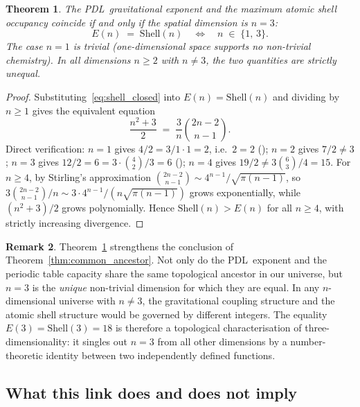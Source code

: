 \documentclass[11pt,a4paper]{article}
\newtheorem{theorem}{Theorem}[section]
\theoremstyle{definition}
\newtheorem{remark}[theorem]{Remark}
\newcommand{\PDL}{\textnormal{PDL}}
\newcommand{\Efun}{E}
\newcommand{\Shell}{\mathrm{Shell}}
\begin{document}
\begin{theorem}
  \label{thm:n_equals_3}
  The \PDL\ gravitational exponent and the maximum atomic shell occupancy coincide if and only if the spatial dimension is $n = 3$:
  \begin{equation}
    \label{eq:n3_unique}
    \Efun(n) \;=\; \Shell(n) \quad\iff\quad n \;\in\; \{1,\, 3\}.
  \end{equation}
  The case $n=1$ is trivial (one-dimensional space supports no non-trivial chemistry). In all dimensions $n \geq 2$ with $n \neq 3$, the two quantities are strictly unequal.
\end{theorem}

\begin{proof}
  Substituting~\eqref{eq:shell_closed} into $\Efun(n) = \Shell(n)$ and dividing by $n \geq 1$ gives the equivalent equation
  \[
    \frac{n^2+3}{2} \;=\; \frac{3}{n}\binom{2n-2}{n-1}.
  \]
  Direct verification: $n=1$ gives $4/2 = 3/1 \cdot 1 = 2$, i.e.\ $2=2$ (\checkmark); $n=2$ gives $7/2 \neq 3$; $n=3$ gives $12/2 = 6 = 3 \cdot \binom{4}{2}/3 = 6$ (\checkmark); $n=4$ gives $19/2 \neq 3\binom{6}{3}/4 = 15$. For $n \geq 4$, by Stirling's approximation $\binom{2n-2}{n-1} \sim 4^{n-1}/\sqrt{\pi(n-1)}$, so $3\binom{2n-2}{n-1}/n \sim 3 \cdot 4^{n-1}/(n\sqrt{\pi(n-1)})$ grows exponentially, while $(n^2+3)/2$ grows polynomially. Hence $\Shell(n) > \Efun(n)$ for all $n \geq 4$, with strictly increasing divergence.
\end{proof}

\begin{remark}
  \label{rem:3d_unique}
  Theorem~\ref{thm:n_equals_3} strengthens the conclusion of Theorem~\ref{thm:common_ancestor}. Not only do the \PDL\ exponent and the periodic table capacity share the same topological ancestor in our universe, but $n=3$ is the \emph{unique} non-trivial dimension for which they are equal. In any $n$-dimensional universe with $n \neq 3$, the gravitational coupling structure and the atomic shell structure would be governed by different integers. The equality $\Efun(3) = \Shell(3) = 18$ is therefore a topological characterisation of three-dimensionality: it singles out $n=3$ from all other dimensions by a number-theoretic identity between two independently defined functions.
\end{remark}

\subsection{What this link does and does not imply}
\label{subsec:limits}
\end{document}
